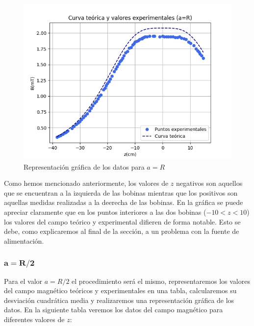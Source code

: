 \documentclass[a4paper,12pt,titlepage]{article}
\begin{document}
\begin{figure}[h!]
    \centering
    \includegraphics[width=0.85\linewidth]{Images/CurvaB1.png}
    \caption{Representación gráfica de los datos para $a=R$}
\end{figure}

Como hemos mencionado anteriormente, los valores de $z$ negativos son aquellos que se encuentran a la izquierda de las bobinas mientras que los positivos son aquellas medidas realizadas a la deerecha de las bobinas. En la gráfica se puede apreciar claramente que en los puntos interiores a las dos bobinas ($-10<z<10$) los valores del campo teórico y experimental difieren de forma notable. Esto se debe, como explicaremos al final de la sección, a un problema con la fuente de alimentación.

\subsubsection{$\mathbf{a=R/2}$}

Para el valor $a=R/2$ el procedimiento será el mismo, representaremos los valores del campo magnético teóricos y experimentales en una tabla, calcularemos su desviación cuadrática media y realizaremos una representación gráfica de los datos. En la siguiente tabla veremos los datos del campo magnético para diferentes valores de $z$:

\newpage
\end{document}
